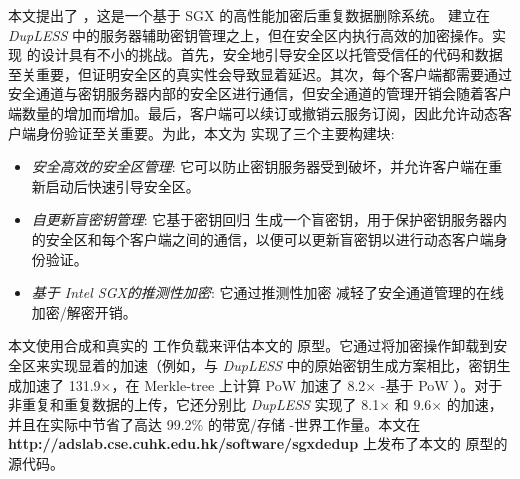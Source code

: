 本文提出了 \sysnameS，这是一个基于 SGX 的高性能加密后重复数据删除系统。 \sysnameS 建立在 {\em DupLESS} \cite{bellare2013DupLESS} 中的服务器辅助密钥管理之上，但在安全区内执行高效的加密操作。实现 \sysnameS 的设计具有不小的挑战。首先，安全地引导安全区以托管受信任的代码和数据至关重要，但证明安全区的真实性会导致显着延迟。其次，每个客户端都需要通过安全通道与密钥服务器内部的安全区进行通信，但安全通道的管理开销会随着客户端数量的增加而增加。最后，客户端可以续订或撤销云服务订阅，因此允许动态客户端身份验证至关重要。为此，本文为 \sysnameS 实现了三个主要构建块: 

\begin{itemize}[leftmargin=*]
    \item \textit{安全高效的安全区管理}:
        它可以防止密钥服务器受到破坏，并允许客户端在重新启动后快速引导安全区。
    \item \textit{自更新盲密钥管理}:
        它基于密钥回归 \cite{fu06} 生成一个盲密钥，用于保护密钥服务器内的安全区和每个客户端之间的通信，以便可以更新盲密钥以进行动态客户端身份验证。
    \item \textit{基于 Intel SGX的推测性加密}:
        它通过推测性加密 \cite{eduardo2019Speculative} 减轻了安全通道管理的在线加密/解密开销。
\end{itemize}

本文使用合成和真实的 \cite{fsl,meyer2011deduplication} 工作负载来评估本文的 \sysnameS 原型。它通过将加密操作卸载到安全区来实现显着的加速（例如，与 {\em DupLESS} \cite{bellare2013DupLESS} 中的原始密钥生成方案相比，密钥生成加速了 131.9$\times$，在 Merkle-tree 上计算 PoW 加速了 8.2$\times$ -基于 PoW \cite{halevi11}）。对于非重复和重复数据的上传，它还分别比 {\em DupLESS} \cite{bellare2013DupLESS} 实现了 8.1$\times$ 和 9.6$\times$ 的加速，并且在实际中节省了高达 99.2\% 的带宽/存储 -世界工作量。本文在 {\bf http://adslab.cse.cuhk.edu.hk/software/sgxdedup} 上发布了本文的 \sysnameS 原型的源代码。 

